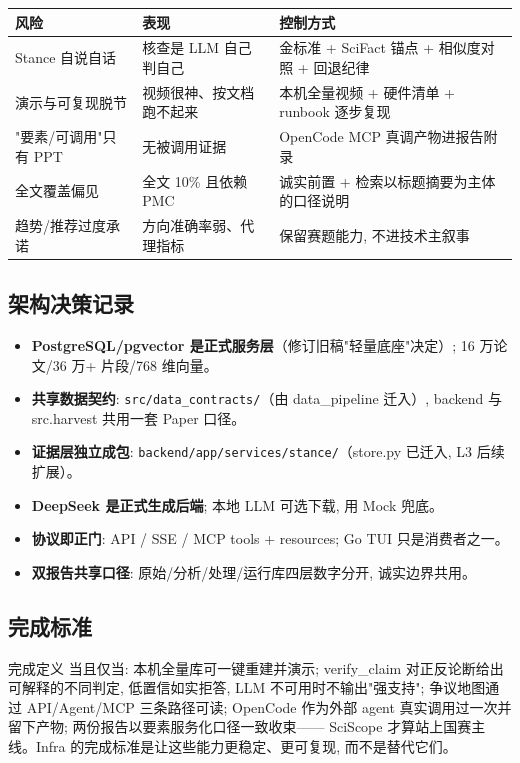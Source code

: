 \begin{center}
\begin{tabularx}{\textwidth}{p{33mm}X X}
\toprule
风险 & 表现 & 控制方式 \\
\midrule
Stance 自说自话 & 核查是 LLM 自己判自己 & 金标准 + SciFact 锚点 + 相似度对照 + 回退纪律 \\
演示与可复现脱节 & 视频很神、按文档跑不起来 & 本机全量视频 + 硬件清单 + runbook 逐步复现 \\
"要素/可调用"只有 PPT & 无被调用证据 & OpenCode MCP 真调产物进报告附录 \\
全文覆盖偏见 & 全文 10\% 且依赖 PMC & 诚实前置 + 检索以标题摘要为主体的口径说明 \\
趋势/推荐过度承诺 & 方向准确率弱、代理指标 & 保留赛题能力, 不进技术主叙事 \\
\bottomrule
\end{tabularx}
\end{center}

\subsection{架构决策记录}

\begin{plainbox}
\begin{itemize}
  \item \textbf{PostgreSQL/pgvector 是正式服务层}（修订旧稿"轻量底座"决定）; 16 万论文/36 万+ 片段/768 维向量。
  \item \textbf{共享数据契约}: \texttt{src/data\_contracts/}（由 data\_pipeline 迁入）, backend 与 src.harvest 共用一套 Paper 口径。
  \item \textbf{证据层独立成包}: \texttt{backend/app/services/stance/}（store.py 已迁入, L3 后续扩展）。
  \item \textbf{DeepSeek 是正式生成后端}; 本地 LLM 可选下载, 用 Mock 兜底。
  \item \textbf{协议即正门}: API / SSE / MCP tools + resources; Go TUI 只是消费者之一。
  \item \textbf{双报告共享口径}: 原始/分析/处理/运行库四层数字分开, 诚实边界共用。
\end{itemize}
\end{plainbox}

\subsection{完成标准}

\begin{designbox}{完成定义}
当且仅当: 本机全量库可一键重建并演示; verify\_claim 对正反论断给出可解释的不同判定,
低置信如实拒答, LLM 不可用时不输出"强支持"; 争议地图通过 API/Agent/MCP 三条路径可读;
OpenCode 作为外部 agent 真实调用过一次并留下产物; 两份报告以要素服务化口径一致收束——
SciScope 才算站上国赛主线。Infra 的完成标准是让这些能力更稳定、更可复现,
而不是替代它们。
\end{designbox}
